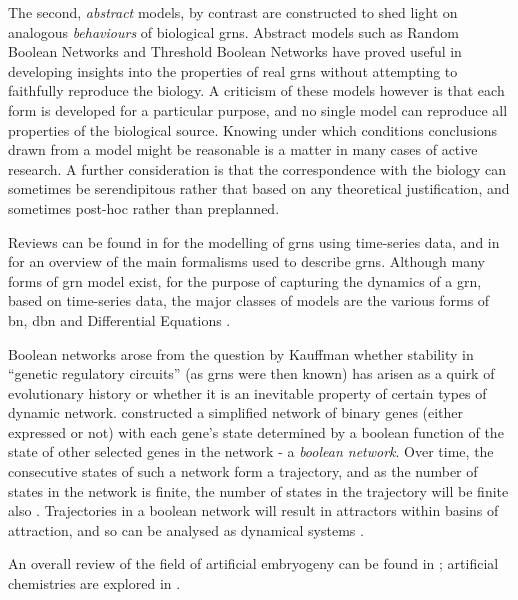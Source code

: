 The second, \emph{abstract} models, by contrast are constructed to shed light on analogous \emph{behaviours} of biological \glspl{grn}. Abstract models such as Random Boolean Networks and Threshold Boolean Networks have proved useful in developing insights into the properties of real \glspl{grn} without attempting to faithfully reproduce the biology. A criticism of these models however is that each form is developed for a particular purpose, and no single model can reproduce all properties of the biological source. Knowing under which conditions conclusions drawn from a model might be reasonable is a matter in many cases of active research.  A further consideration is that the correspondence with the biology can sometimes be serendipitous rather that based on any theoretical justification, and sometimes post-hoc rather than preplanned.

Reviews can be found in \cite{Sima:2009lv} for the modelling of \glspl{grn} using time-series data, and in \cite{De-Jong:2002jv} for an overview of the main formalisms used to describe \glspl{grn}. Although many forms of \gls{grn} model exist, for the purpose of capturing the dynamics of a \gls{grn}, based on time-series data, the major classes of models are the various forms of \gls{bn}, \gls{dbn} and Differential Equations \cite{Sima:2009lv}.

Boolean networks arose from the question by Kauffman \cite{Kauffman:1969ne} whether stability in ``genetic
regulatory circuits'' (as \glspl{grn} were then known) has arisen as a quirk of evolutionary history or whether it is an
inevitable property of certain types of dynamic network. \cite{Kauffman:1969ne} constructed a simplified network of
binary genes (either expressed or not) with each gene's state determined by a boolean function of the state of other
selected genes in the network - a \emph{boolean network}. Over time, the consecutive states of such a network form a
trajectory, and as the number of states in the network is finite, the number of states in the trajectory will be finite
also \cite{De-Jong:2002jv}. Trajectories in a boolean network will result in attractors within basins of
attraction, and so can be analysed as dynamical systems \cite{Luque:1997qo,Kauffman:1969ne,Kauffman:1993kk}.

An overall review of the field of artificial embryogeny can be found in \cite{Stanley:2003fh}; artificial chemistries
are explored in \cite{Dittrich:2001zr}.

